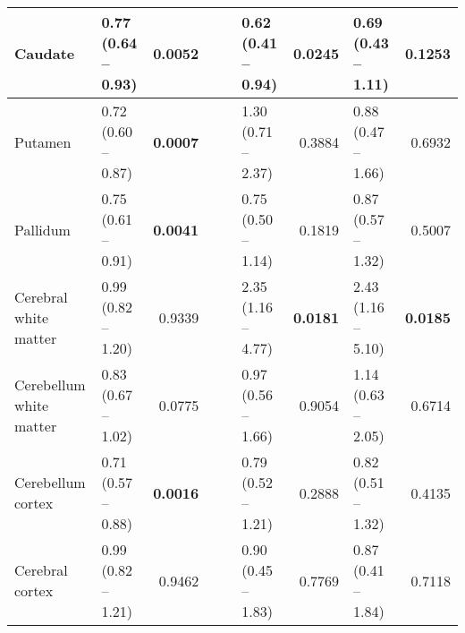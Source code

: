 \begin{sidewaystable}
{\begin{tabular}{|l|lr|lr|lr|lr|}
\hline
Caudate & \textcolor[rgb]{0.2,0.2,0.2}{0.77 (0.64 -- 0.93)} & \textcolor[rgb]{0.2,0.2,0.2}{\textbf{0.0052}} & {\cellcolor[rgb]{0.753,0.753,0.753}} & {\cellcolor[rgb]{0.753,0.753,0.753}} & \textcolor[rgb]{0.2,0.2,0.2}{0.62 (0.41 -- 0.94)} & \textcolor[rgb]{0.2,0.2,0.2}{\textbf{0.0245}} & \textcolor[rgb]{0.2,0.2,0.2}{0.69 (0.43 -- 1.11)} & \textcolor[rgb]{0.2,0.2,0.2}{0.1253} \\ 
\hline
Putamen & \textcolor[rgb]{0.2,0.2,0.2}{0.72 (0.60 -- 0.87)} & \textcolor[rgb]{0.2,0.2,0.2}{\textbf{0.0007}} & {\cellcolor[rgb]{0.753,0.753,0.753}} & {\cellcolor[rgb]{0.753,0.753,0.753}} & \textcolor[rgb]{0.2,0.2,0.2}{1.30 (0.71 -- 2.37)} & \textcolor[rgb]{0.2,0.2,0.2}{0.3884} & \textcolor[rgb]{0.2,0.2,0.2}{0.88 (0.47 -- 1.66)} & \textcolor[rgb]{0.2,0.2,0.2}{0.6932} \\ 
\hline
Pallidum & \textcolor[rgb]{0.2,0.2,0.2}{0.75 (0.61 -- 0.91)} & \textcolor[rgb]{0.2,0.2,0.2}{\textbf{0.0041}} & {\cellcolor[rgb]{0.753,0.753,0.753}} & {\cellcolor[rgb]{0.753,0.753,0.753}} & \textcolor[rgb]{0.2,0.2,0.2}{0.75 (0.50 -- 1.14)} & \textcolor[rgb]{0.2,0.2,0.2}{0.1819} & \textcolor[rgb]{0.2,0.2,0.2}{0.87 (0.57 -- 1.32)} & \textcolor[rgb]{0.2,0.2,0.2}{0.5007} \\ 
\hline
Cerebral white matter & \textcolor[rgb]{0.2,0.2,0.2}{0.99 (0.82 -- 1.20)} & \textcolor[rgb]{0.2,0.2,0.2}{0.9339} & {\cellcolor[rgb]{0.753,0.753,0.753}} & {\cellcolor[rgb]{0.753,0.753,0.753}} & \textcolor[rgb]{0.2,0.2,0.2}{2.35 (1.16 -- 4.77)} & \textcolor[rgb]{0.2,0.2,0.2}{\textbf{0.0181}} & \textcolor[rgb]{0.2,0.2,0.2}{2.43 (1.16 -- 5.10)} & \textcolor[rgb]{0.2,0.2,0.2}{\textbf{0.0185}} \\ 
\hline
Cerebellum white matter & \textcolor[rgb]{0.2,0.2,0.2}{0.83 (0.67 -- 1.02)} & \textcolor[rgb]{0.2,0.2,0.2}{0.0775} & {\cellcolor[rgb]{0.753,0.753,0.753}} & {\cellcolor[rgb]{0.753,0.753,0.753}} & \textcolor[rgb]{0.2,0.2,0.2}{0.97 (0.56 -- 1.66)} & \textcolor[rgb]{0.2,0.2,0.2}{0.9054} & \textcolor[rgb]{0.2,0.2,0.2}{1.14 (0.63 -- 2.05)} & \textcolor[rgb]{0.2,0.2,0.2}{0.6714} \\ 
\hline
Cerebellum cortex & \textcolor[rgb]{0.2,0.2,0.2}{0.71 (0.57 -- 0.88)} & \textcolor[rgb]{0.2,0.2,0.2}{\textbf{0.0016}} & {\cellcolor[rgb]{0.753,0.753,0.753}} & {\cellcolor[rgb]{0.753,0.753,0.753}} & \textcolor[rgb]{0.2,0.2,0.2}{0.79 (0.52 -- 1.21)} & \textcolor[rgb]{0.2,0.2,0.2}{0.2888} & \textcolor[rgb]{0.2,0.2,0.2}{0.82 (0.51 -- 1.32)} & \textcolor[rgb]{0.2,0.2,0.2}{0.4135} \\ 
\hline
Cerebral cortex & \textcolor[rgb]{0.2,0.2,0.2}{0.99 (0.82 -- 1.21)} & \textcolor[rgb]{0.2,0.2,0.2}{0.9462} & {\cellcolor[rgb]{0.753,0.753,0.753}} & {\cellcolor[rgb]{0.753,0.753,0.753}} & \textcolor[rgb]{0.2,0.2,0.2}{0.90 (0.45 -- 1.83)} & \textcolor[rgb]{0.2,0.2,0.2}{0.7769} & \textcolor[rgb]{0.2,0.2,0.2}{0.87 (0.41 -- 1.84)} & \textcolor[rgb]{0.2,0.2,0.2}{0.7118} \\
\hline
\end{tabular}
}
\end{sidewaystable}


